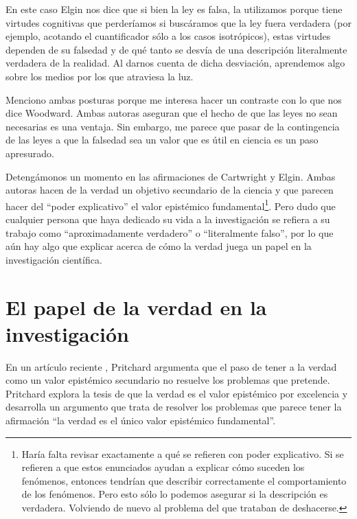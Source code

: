 En este caso Elgin nos dice que si bien la ley es falsa, la utilizamos porque tiene virtudes cognitivas que perderíamos si buscáramos que la ley fuera verdadera (por ejemplo, acotando el cuantificador sólo a los casos isotrópicos), estas virtudes dependen de su falsedad y de qué tanto se desvía de una descripción literalmente verdadera de la realidad. Al darnos cuenta de dicha desviación, aprendemos algo sobre los medios por los que atraviesa la luz.

Menciono ambas posturas porque me interesa hacer un contraste con lo que nos dice Woodward. Ambas autoras aseguran que el hecho de que las leyes no sean necesarias es una ventaja. Sin embargo, me parece que pasar de la contingencia de las leyes a que la falsedad sea un valor que es útil en ciencia es un paso apresurado.

Detengámonos un momento en las afirmaciones de Cartwright y Elgin. Ambas autoras hacen de la verdad un objetivo secundario de la ciencia y que parecen hacer del ``poder explicativo'' el valor epistémico fundamental\footnote{Haría falta revisar exactamente a qué se refieren con poder explicativo. Si se refieren a que estos enunciados ayudan a explicar cómo suceden los fenómenos, entonces tendrían que describir correctamente el comportamiento de los fenómenos. Pero esto sólo lo podemos asegurar si la descripción es verdadera. Volviendo de nuevo al problema del que trataban de deshacerse.}. Pero dudo que cualquier persona que haya dedicado su vida a la investigación se refiera a su trabajo como ``aproximadamente verdadero'' o ``literalmente falso'', por lo que aún hay algo que explicar acerca de cómo la verdad juega un papel en la investigación científica.

\section{El papel de la verdad en la investigación}

\noindent En un artículo reciente \cite{Pritchard2019}, Pritchard argumenta que el paso de tener a la verdad como un valor epistémico secundario no resuelve los problemas que pretende. Pritchard explora la tesis de que la verdad es el valor epistémico por excelencia y desarrolla un argumento que trata de resolver los problemas que parece tener la afirmación ``la verdad es el único valor epistémico fundamental''.

